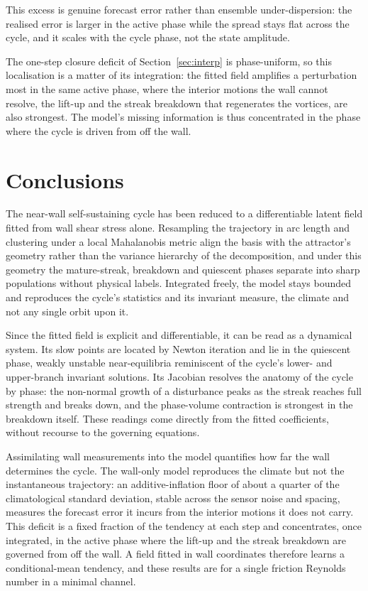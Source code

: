 \documentclass[pdflatex,sn-basic]{sn-jnl}
\theoremstyle{thmstyleone}%
\theoremstyle{thmstyletwo}%
\theoremstyle{thmstylethree}%
\begin{document}
This excess
is genuine forecast error rather than ensemble under-dispersion: the realised error is
larger in the active phase while the spread stays flat across the cycle, and it scales
with the cycle phase, not the state amplitude. 

The one-step closure deficit of
Section~\ref{sec:interp} is phase-uniform, so this localisation is a matter of its
integration: the fitted field amplifies a perturbation most in the same active phase,
where the interior motions the wall cannot resolve, the lift-up and the streak
breakdown that regenerates the vortices, are also strongest. The model's missing
information is thus concentrated in the phase where the cycle is driven from off the
wall.

\section{Conclusions}\label{sec:conclusions}

The near-wall self-sustaining cycle has been reduced to a differentiable latent field
fitted from wall shear stress alone. Resampling the trajectory in arc length and
clustering under a local Mahalanobis metric align the basis with the attractor's
geometry rather than the variance hierarchy of the decomposition, and under this
geometry the mature-streak, breakdown and quiescent phases separate into sharp
populations without physical labels. Integrated freely, the model stays bounded and
reproduces the cycle's statistics and its invariant measure, the climate and not any
single orbit upon it.

Since the fitted field is explicit and differentiable, it can be read as a dynamical
system. Its slow points are located by Newton iteration and lie in the quiescent
phase, weakly unstable near-equilibria reminiscent of the cycle's lower- and
upper-branch invariant solutions. Its Jacobian resolves the anatomy of the cycle by
phase: the non-normal growth of a disturbance peaks as the streak reaches full strength
and breaks down, and the phase-volume contraction is strongest in the breakdown itself.
These readings come directly from the fitted coefficients, without recourse to the
governing equations.

Assimilating wall measurements into the model quantifies how far the wall determines
the cycle. The wall-only model reproduces the climate but not the instantaneous
trajectory: an additive-inflation floor of about a quarter of the climatological
standard deviation, stable across the sensor noise and spacing, measures the forecast
error it incurs from the interior motions it does not carry. This deficit is a fixed
fraction of the tendency at each step and concentrates, once integrated, in the active
phase where the lift-up and the streak breakdown are governed from off the wall. A
field fitted in wall coordinates therefore learns a conditional-mean tendency, and
these results are for a single friction Reynolds number in a minimal channel.
\end{document}
